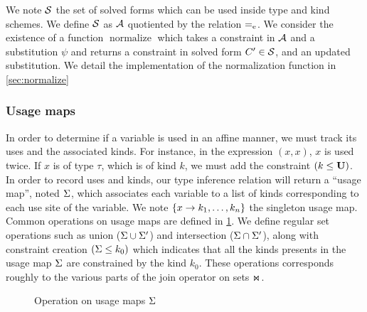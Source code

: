 We note $\mathcal S$ the set of solved forms
which can be used inside type and kind schemes.
We define $\mathcal S$ as $\mathcal A$ quotiented by the relation $\operatorname{=_e}$.
%
We consider the existence of a function $\operatorname{normalize}$ which takes
a constraint in $\mathcal A$ and a substitution $\psi$ and returns a constraint
in solved form $C' \in \mathcal S$,
and an updated substitution. We detail the implementation
of the normalization function in \cref{sec:normalize}




\subsubsection{Usage maps}

In order to determine if a variable is used in an affine manner, we must track
its uses and the associated kinds. For instance, in the expression
$(x,x)$, $x$ is used twice. If $x$ is of type $\tau$, which is of kind $k$,
we must add the constraint $(k \leq \mathbf{U})$. In order to record uses and kinds,
our type inference relation will return a ``usage map'', noted $\Sigma$,
which associates each variable to a list of kinds corresponding to each use site
of the variable.
We note $\left\{x \to k_1,\dots,k_n\right\}$ the singleton usage map.
Common operations on usage maps are defined in \cref{op:usgmap}. We define
regular set operations such as union
($\Sigma\cup\Sigma'$) and intersection ($\Sigma\cap\Sigma'$), along
with constraint creation $(\Sigma \leq k_0)$ which indicates that all the kinds
presents in the usage map $\Sigma$ are constrained by the kind $k_0$.
These operations corresponds roughly to the various parts of the join
operator on sets $\operatorname{\Join}$.

\begin{figure}[tp]\centering
{}
\caption{Operation on usage maps $\Sigma$}
\label{op:usgmap}
\end{figure}

